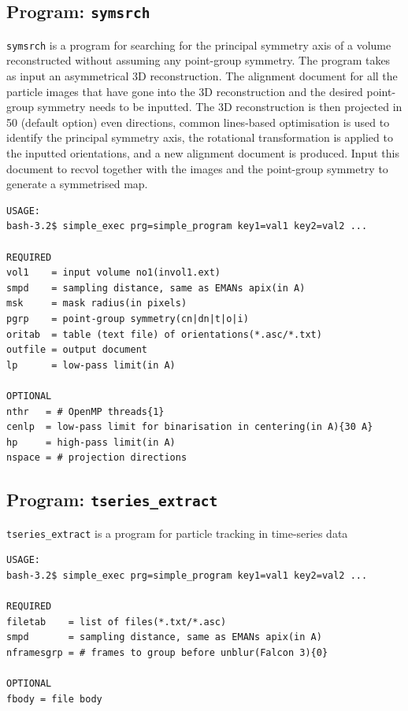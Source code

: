 \documentclass[a4paper,11pt]{article}
\newcommand{\prgname}[1]{\textcolor{NavyBlue}{\texttt{#1}}}
\begin{document}
\subsection{Program: \prgname{symsrch}}
\label{symsrch}
\prgname{symsrch} is a program for searching for the principal symmetry axis of a volume reconstructed without assuming any point-group symmetry. The program takes as input an asymmetrical 3D reconstruction. The alignment document for all the particle images that have gone into the 3D reconstruction and the desired point-group symmetry needs to be inputted. The 3D reconstruction is then projected in 50 (default option) even directions, common lines-based optimisation is used to identify the principal symmetry axis, the rotational transformation is applied to the inputted orientations, and a new alignment document is produced. Input this document to recvol together with the images and the point-group symmetry to generate a symmetrised map.

\begin{verbatim}
USAGE:
bash-3.2$ simple_exec prg=simple_program key1=val1 key2=val2 ...

REQUIRED
vol1    = input volume no1(invol1.ext)
smpd    = sampling distance, same as EMANs apix(in A)
msk     = mask radius(in pixels)
pgrp    = point-group symmetry(cn|dn|t|o|i)
oritab  = table (text file) of orientations(*.asc/*.txt)
outfile = output document
lp      = low-pass limit(in A)

OPTIONAL
nthr   = # OpenMP threads{1}
cenlp  = low-pass limit for binarisation in centering(in A){30 A}
hp     = high-pass limit(in A)
nspace = # projection directions
\end{verbatim}

\subsection{Program: \prgname{tseries\_extract}}
\label{tseries_extract}
\prgname{tseries\_extract} is a program for particle tracking in time-series data 

\begin{verbatim}
USAGE:
bash-3.2$ simple_exec prg=simple_program key1=val1 key2=val2 ...

REQUIRED
filetab    = list of files(*.txt/*.asc)
smpd       = sampling distance, same as EMANs apix(in A)
nframesgrp = # frames to group before unblur(Falcon 3){0}

OPTIONAL
fbody = file body
\end{verbatim}
\end{document}
